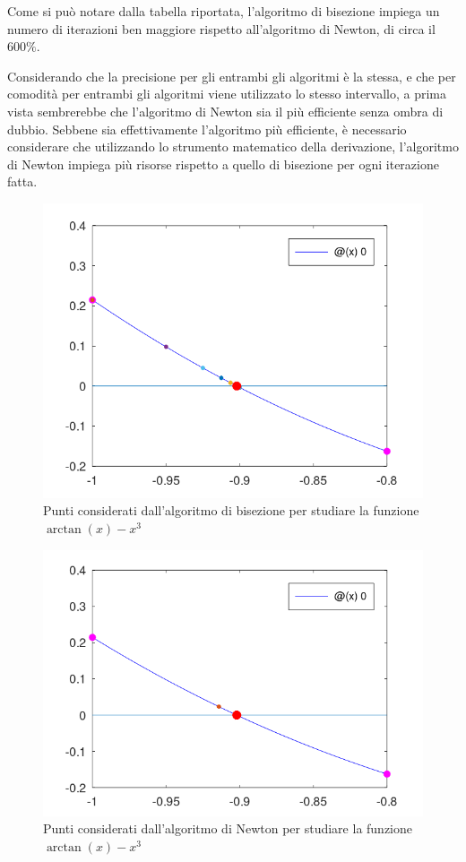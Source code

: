\documentclass[a4paper]{article}
\begin{document}
Come si può notare dalla tabella riportata, l'algoritmo di bisezione impiega un numero di iterazioni ben maggiore rispetto all'algoritmo di Newton, di circa il $600\%$. 

Considerando che la precisione per gli entrambi gli algoritmi è la stessa, e che per comodità per entrambi gli algoritmi viene utilizzato lo stesso intervallo, a prima vista sembrerebbe che l'algoritmo di Newton sia il più efficiente senza ombra di dubbio. Sebbene sia effettivamente l'algoritmo più efficiente, è necessario considerare che utilizzando lo strumento matematico della derivazione, l'algoritmo di Newton impiega più risorse rispetto a quello di bisezione per ogni iterazione fatta.

\begin{figure}
\centering
\includegraphics[width=12cm]{Bisezione}
\caption{Punti considerati dall'algoritmo di bisezione per studiare la funzione $\arctan(x)-x^3$}
\label{fig:bis}
\end{figure}
\begin{figure}
\centering
\includegraphics[width=12cm]{Newton}
\caption{Punti considerati dall'algoritmo di Newton per studiare la funzione $\arctan(x)-x^3$}
\label{fig:new}
\end{figure}
\end{document}
